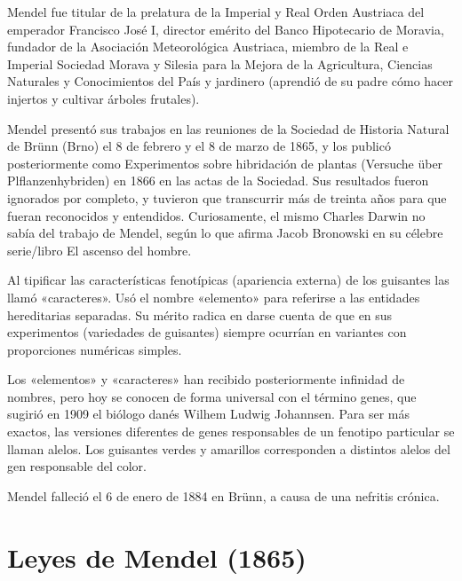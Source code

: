 \documentclass[letterpaper,11pt]{report}
\begin{document}
\newpage

Mendel fue titular de la prelatura de la Imperial y Real Orden Austriaca del emperador Francisco José I, director emérito del Banco Hipotecario de Moravia, fundador de la Asociación Meteorológica Austriaca, miembro de la Real e Imperial Sociedad Morava y Silesia para la Mejora de la Agricultura, Ciencias Naturales y Conocimientos del País y jardinero (aprendió de su padre cómo hacer injertos y cultivar árboles frutales).

Mendel presentó sus trabajos en las reuniones de la Sociedad de Historia Natural de Brünn\cite{ascent} (Brno) el 8 de febrero y el 8 de marzo de 1865, y los publicó posteriormente como Experimentos sobre hibridación de plantas (Versuche über Plflanzenhybriden) en 1866 en las actas de la Sociedad. Sus resultados fueron ignorados por completo, y tuvieron que transcurrir más de treinta años para que fueran reconocidos y entendidos.\cite{evolucion} Curiosamente, el mismo Charles Darwin no sabía del trabajo de Mendel, según lo que afirma Jacob Bronowski en su célebre serie/libro El ascenso del hombre.\cite{ascent}

Al tipificar las características fenotípicas (apariencia externa) de los guisantes las llamó «caracteres». Usó el nombre «elemento» para referirse a las entidades hereditarias separadas. Su mérito radica en darse cuenta de que en sus experimentos (variedades de guisantes) siempre ocurrían en variantes con proporciones numéricas simples.

Los «elementos» y «caracteres» han recibido posteriormente infinidad de nombres, pero hoy se conocen de forma universal con el término genes, que sugirió en 1909 el biólogo danés Wilhem Ludwig Johannsen. Para ser más exactos, las versiones diferentes de genes responsables de un fenotipo particular se llaman alelos. Los guisantes verdes y amarillos corresponden a distintos alelos del gen responsable del color.

Mendel falleció el 6 de enero de 1884 en Brünn, a causa de una nefritis crónica.






\chapter{Leyes de Mendel (1865)}
\end{document}
